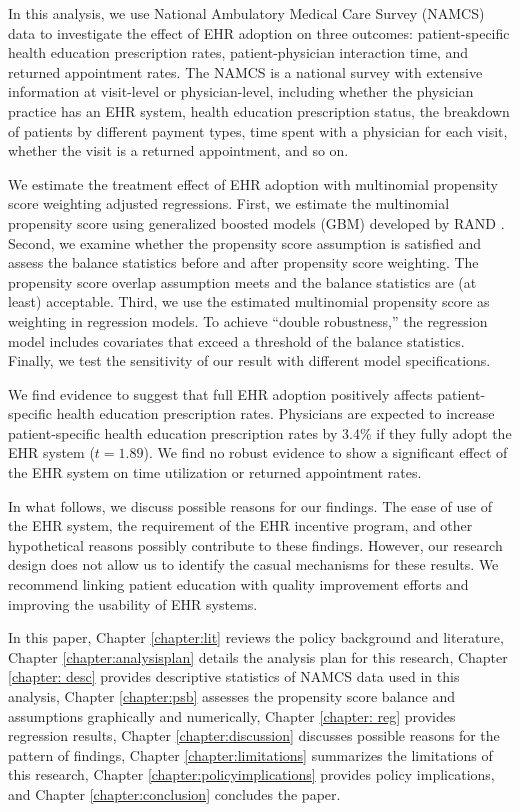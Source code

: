 \documentclass[12pt]{report}
\begin{document}
In this analysis, we use National Ambulatory Medical Care Survey (NAMCS) data to investigate the effect of EHR adoption on three outcomes: patient-specific health education prescription rates, patient-physician interaction time, and returned appointment rates. The NAMCS is a national survey with extensive information at visit-level or physician-level, including whether the physician practice has an EHR system, health education prescription status, the breakdown of patients by different payment types, time spent with a physician for each visit, whether the visit is a returned appointment, and so on.

We estimate the treatment effect of EHR adoption with multinomial propensity score weighting adjusted regressions. First, we estimate the multinomial propensity score using generalized boosted models (GBM)  developed by RAND \citep{mccaffrey2013tutorial}. Second, we examine whether the propensity score assumption is satisfied and assess the balance statistics before and after propensity score weighting. The propensity score overlap assumption meets and the balance statistics are (at least) acceptable. Third, we use the estimated multinomial propensity score as weighting in regression models. To achieve ``double robustness,'' the regression model includes covariates that exceed a threshold of the balance statistics. Finally, we test the sensitivity of our result with different model specifications.

We find evidence to suggest that full EHR adoption positively affects patient-specific health education prescription rates. Physicians are expected to increase patient-specific health education prescription rates by 3.4\% if they fully adopt the EHR system ($t=1.89$). We find no robust evidence to show a significant effect of the EHR system on time utilization or returned appointment rates.

In what follows, we discuss possible reasons for our findings. The ease of use of the EHR system, the requirement of the EHR incentive program, and other hypothetical reasons possibly contribute to these findings. However, our research design does not allow us to identify the casual mechanisms for these results. We recommend linking patient education with quality improvement efforts and improving the usability of EHR systems.

In this paper, Chapter \ref{chapter:lit} reviews the policy background and literature, Chapter \ref{chapter:analysisplan} details the analysis plan for this research, Chapter \ref{chapter: desc} provides descriptive statistics of NAMCS data used in this analysis, Chapter \ref{chapter:psb} assesses the propensity score balance and assumptions graphically and numerically, Chapter \ref{chapter: reg} provides regression results, Chapter \ref{chapter:discussion} discusses possible reasons for the pattern of findings, Chapter \ref{chapter:limitations} summarizes the limitations of this research, Chapter \ref{chapter:policyimplications} provides policy implications, and Chapter \ref{chapter:conclusion} concludes the paper.
\end{document}
